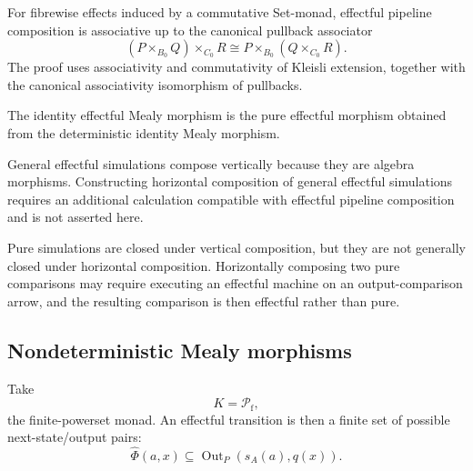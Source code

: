 \begin{remark}
\label{rem:associativity-effectful-pipelines}
    For fibrewise effects induced by a commutative Set-monad, effectful
    pipeline composition is associative up to the canonical pullback
    associator
    \[
        (P\times_{B_0}Q)\times_{C_0}R
        \cong
        P\times_{B_0}(Q\times_{C_0}R).
    \]
    The proof uses associativity and commutativity of Kleisli extension,
    together with the canonical associativity isomorphism of pullbacks.

    The identity effectful Mealy morphism is the pure effectful morphism
    obtained from the deterministic identity Mealy morphism.

    General effectful simulations compose vertically because they are
    algebra morphisms. Constructing horizontal composition of general
    effectful simulations requires an additional calculation compatible with
    effectful pipeline composition and is not asserted here.

    Pure simulations are closed under vertical composition, but they are not
    generally closed under horizontal composition. Horizontally composing two
    pure comparisons may require executing an effectful machine on an
    output-comparison arrow, and the resulting comparison is then effectful
    rather than pure.
\end{remark}

\subsection{Nondeterministic Mealy morphisms}
\label{subsec:nondeterministic-mealy-morphisms}

Take
\[
    K=\mathcal P_{\mathrm f},
\]
the finite-powerset monad. An effectful transition is then a finite set of
possible next-state/output pairs:
\[
    \widehat\Phi(a,x)
    \subseteq
    \operatorname{Out}_P(s_A(a),q(x)).
\]

